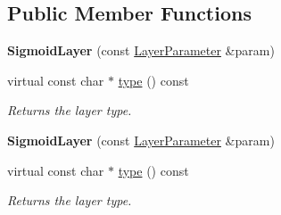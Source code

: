 \subsection*{Public Member Functions}
\begin{DoxyCompactItemize}
\item 
\mbox{\label{classcaffe_1_1_sigmoid_layer_a590e2978bafd7722535e64c0326c59ce}} 
{\bfseries Sigmoid\+Layer} (const \mbox{\hyperlink{classcaffe_1_1_layer_parameter}{Layer\+Parameter}} \&param)
\item 
\mbox{\label{classcaffe_1_1_sigmoid_layer_a820deac6605e5048cd15e00d7602b101}} 
virtual const char $\ast$ \mbox{\hyperlink{classcaffe_1_1_sigmoid_layer_a820deac6605e5048cd15e00d7602b101}{type}} () const
\begin{DoxyCompactList}\small\item\em Returns the layer type. \end{DoxyCompactList}\item 
\mbox{\label{classcaffe_1_1_sigmoid_layer_a590e2978bafd7722535e64c0326c59ce}} 
{\bfseries Sigmoid\+Layer} (const \mbox{\hyperlink{classcaffe_1_1_layer_parameter}{Layer\+Parameter}} \&param)
\item 
\mbox{\label{classcaffe_1_1_sigmoid_layer_a820deac6605e5048cd15e00d7602b101}} 
virtual const char $\ast$ \mbox{\hyperlink{classcaffe_1_1_sigmoid_layer_a820deac6605e5048cd15e00d7602b101}{type}} () const
\begin{DoxyCompactList}\small\item\em Returns the layer type. \end{DoxyCompactList}\end{DoxyCompactItemize}
